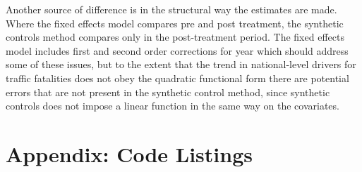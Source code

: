 \documentclass[letterpaper, 12pt]{article}
\begin{document}
Another source of difference is in the structural way the estimates are made.  Where the fixed effects model compares pre and post treatment, the synthetic controls method compares only in the post-treatment period.  The fixed effects model includes first and second order corrections for year which should address some of these issues, but to the extent that the trend in national-level drivers for traffic fatalities does not obey the quadratic functional form there are potential errors that are not present in the synthetic control method, since synthetic controls does not impose a linear function in the same way on the covariates.  

\section{Appendix: Code Listings}



\end{document}

